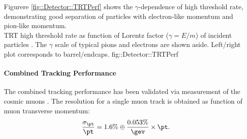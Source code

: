 Figurere \ref{fig::Detector::TRTPerf} shows the $\gamma$-dependence of high threshold rate, demonstrating good separation of particles with electron-like momentum and pion-like momentum. \\

{TRT high threshold rate as function of Lorentz factor ($\gamma=E/m$) of incident particles \cite{TRTPub}.
The $\gamma$ scale of typical pions and electrons are shown aside. Left/right plot corresponds to barrel/endcaps.}
{fig::Detector::TRTPerf}


\paragraph{Combined Tracking Performance}
The combined tracking performance has been validated via measurement of the cosmic muons \cite{ATLAScosmicPerf}. 
The resolution for a single muon track is obtained as function of muon transverse momentum: 
\begin{align}
\frac{\sigma_{\pt}}{\pt} = 1.6\% \oplus \frac{0.053\%}{\gev}\times \pt.  \label{eq::Detector::perf_ID}
\end{align}



